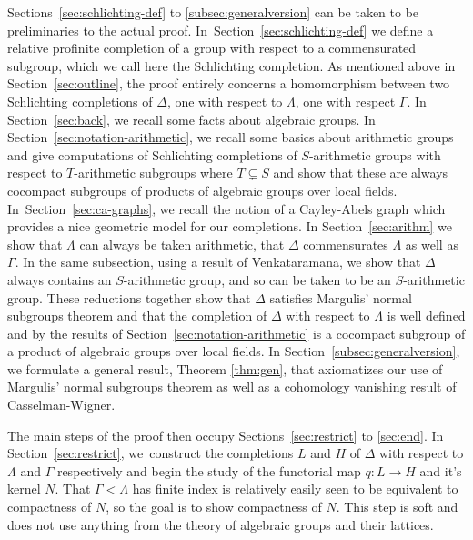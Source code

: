 Sections~\ref{sec:schlichting-def} to \ref{subsec:generalversion} can be taken to be preliminaries
to the actual proof. In~Section~\ref{sec:schlichting-def} we define a relative profinite completion of a group with respect to a commensurated subgroup, which we call here the Schlichting completion. As mentioned above in Section~\ref{sec:outline}, the proof entirely concerns
a homomorphism between two Schlichting completions of $\Delta$, one with respect to $\Lambda$,
one with respect $\Gamma$. In Section~\ref{sec:back}, we recall some
facts about algebraic groups. In Section~\ref{sec:notation-arithmetic}, we recall some basics about arithmetic groups and give computations of Schlichting completions of $S$-arithmetic groups with respect to $T$-arithmetic subgroups where $T \varsubsetneq S$ and show that these are always cocompact subgroups of
products of algebraic groups over local fields. In~Section~\ref{sec:ca-graphs}, we recall the notion of a Cayley-Abels graph which provides a nice geometric model for our completions. In Section~\ref{sec:arithm} we show that $\Lambda$ can always be taken arithmetic, that $\Delta$ commensurates $\Lambda$ as well as $\Gamma$. In the same subsection, using a result of Venkataramana, we show that $\Delta$ always contains an $S$-arithmetic group, and so can be taken to be an $S$-arithmetic group. These reductions together show that $\Delta$ satisfies Margulis' normal subgroups theorem and that the completion of $\Delta$ with respect
to $\Lambda$ is well defined and by the results of Section~\ref{sec:notation-arithmetic} is a
cocompact subgroup of a product of algebraic groups over local fields. In Section~\ref{subsec:generalversion}, we formulate a general result, Theorem \ref{thm:gen}, that axiomatizes our use of Margulis' normal subgroups theorem as well as a cohomology vanishing result of Casselman-Wigner.

The main steps of the proof then occupy Sections~\ref{sec:restrict} to \ref{sec:end}. In Section~\ref{sec:restrict}, we~construct the completions $L$ and $H$ of $\Delta$ with respect to
$\Lambda$ and $\Gamma$ respectively and begin the study of the functorial map $q:L \to H$ and it's kernel $N$. That $\Gamma < \Lambda$ has finite index is relatively easily seen to be equivalent to compactness of $N$, so the goal is to show compactness of $N$. This step is soft and does not use
anything from the theory of algebraic groups and their lattices.

